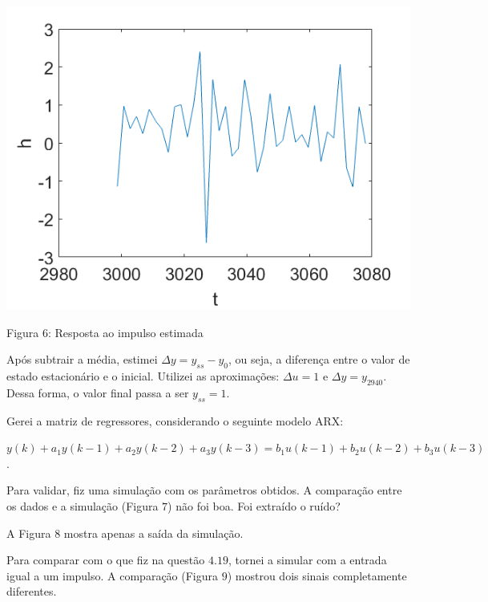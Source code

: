 \documentclass{rbfin}
\begin{document}
\begin{center}
\includegraphics[scale=0.666]{4h}

Figura $6$: Resposta ao impulso estimada
\end{center}

\dotfill

Após subtrair a média, estimei $\Delta y = y_{ss} - y_0$, ou seja, a diferença entre o valor de estado estacionário e o inicial. Utilizei as aproximações: $\Delta u = 1$ e $\Delta y = y_{2940}$. Dessa forma, o valor final passa a ser $y_{ss} = 1$.

Gerei a matriz de regressores, considerando o seguinte modelo ARX:

$y(k) + a_1 y(k-1) + a_2 y(k-2) + a_3 y(k-3) = b_1 u(k - 1) + b_2 u(k - 2) + b_3 u(k - 3)$.

Para validar, fiz uma simulação com os parâmetros obtidos. A comparação entre os dados e a simulação (Figura $7$) não foi boa. Foi extraído o ruído?

A Figura $8$ mostra apenas a saída da simulação.

Para comparar com o que fiz na questão $4.19$, tornei a simular com a entrada igual a um impulso. A comparação (Figura $9$) mostrou dois sinais completamente diferentes.
\end{document}
